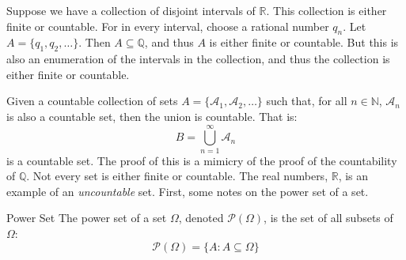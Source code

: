            \begin{lexample}
                Suppose we have a collection of disjoint intervals
                of $\mathbb{R}$. This collection is either finite
                or countable. For in every interval, choose a
                rational number $q_{n}$. Let
                $A=\{q_{1},q_{2},\hdots\}$. Then
                $A\subseteq\mathbb{Q}$, and thus $A$ is either
                finite or countable. But this is also an enumeration
                of the intervals in the collection, and thus the
                collection is either finite or countable.
            \end{lexample}
            Given a countable collection of sets
            $A=\{\mathcal{A}_{1},\mathcal{A}_{2},\hdots\}$ such
            that, for all $n\in\mathbb{N}$, $\mathcal{A}_{n}$ is
            also a countable set, then the union is countable. That is:
            \begin{equation}
                B=\bigcup_{n=1}^{\infty}\mathcal{A}_{n}
            \end{equation}
            is a countable set. The proof of this is a mimicry of
            the proof of the countability of $\mathbb{Q}$. Not
            every set is either finite or countable. The real numbers,
            $\mathbb{R}$, is an example of an \textit{uncountable}
            set. First, some notes on the power set of a set.
            \begin{ldefinition}{Power Set}
                The power set of a set $\Omega$, denoted
                $\mathcal{P}(\Omega)$, is the set of all subsets of
                $\Omega$:
                \begin{equation}
                    \mathcal{P}(\Omega)=
                    \{A:A\subseteq\Omega\}
                \end{equation}
            \end{ldefinition}
